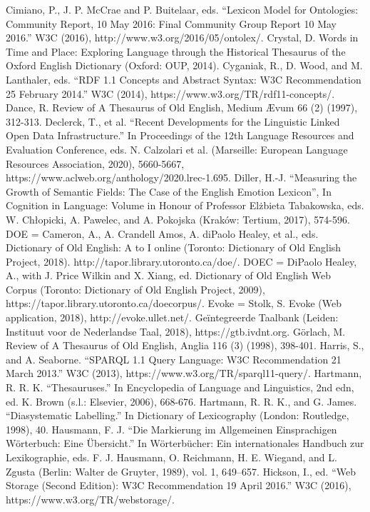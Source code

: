 Cimiano, P., J. P. McCrae and P. Buitelaar, eds. “Lexicon Model for Ontologies: Community Report, 10 May 2016: Final Community Group Report 10 May 2016.” W3C (2016), http://www.w3.org/2016/05/ontolex/.
Crystal, D. Words in Time and Place: Exploring Language through the Historical Thesaurus of the Oxford English Dictionary (Oxford: OUP, 2014).
Cyganiak, R., D. Wood, and M. Lanthaler, eds. “RDF 1.1 Concepts and Abstract Syntax: W3C Recommendation 25 February 2014.” W3C (2014), https://www.w3.org/TR/rdf11-concepts/.
Dance, R. Review of A Thesaurus of Old English, Medium Ævum 66 (2) (1997), 312-313.
Declerck, T., et al. “Recent Developments for the Linguistic Linked Open Data Infrastructure.” In Proceedings of the 12th Language Resources and Evaluation Conference, eds. N. Calzolari et al. (Marseille: European Language Resources Association, 2020), 5660-5667, https://www.aclweb.org/anthology/2020.lrec-1.695.
Diller, H.-J. “Measuring the Growth of Semantic Fields: The Case of the English Emotion Lexicon”, In Cognition in Language: Volume in Honour of Professor Elżbieta Tabakowska, eds. W. Chłopicki, A. Pawelec, and A. Pokojska (Kraków: Tertium, 2017), 574-596.
DOE = Cameron, A., A. Crandell Amos, A. diPaolo Healey, et al., eds. Dictionary of Old English: A to I online (Toronto: Dictionary of Old English Project, 2018). http://tapor.library.utoronto.ca/doe/.
DOEC = DiPaolo Healey, A., with J. Price Wilkin and X. Xiang, ed. Dictionary of Old English Web Corpus (Toronto: Dictionary of Old English Project, 2009), https://tapor.library.utoronto.ca/doecorpus/.
Evoke = Stolk, S. Evoke (Web application, 2018), http://evoke.ullet.net/.
Geïntegreerde Taalbank (Leiden: Instituut voor de Nederlandse Taal, 2018), https://gtb.ivdnt.org.
Görlach, M. Review of A Thesaurus of Old English, Anglia 116 (3) (1998), 398-401.
Harris, S., and A. Seaborne. “SPARQL 1.1 Query Language: W3C Recommendation 21 March 2013.” W3C (2013), https://www.w3.org/TR/sparql11-query/.
Hartmann, R. R. K. “Thesauruses.” In Encyclopedia of Language and Linguistics, 2nd edn, ed. K. Brown (s.l.: Elsevier, 2006), 668-676.
Hartmann, R. R. K., and G. James. “Diasystematic Labelling.” In Dictionary of Lexicography (London: Routledge, 1998), 40.
Hausmann, F. J. “Die Markierung im Allgemeinen Einsprachigen Wörterbuch: Eine Übersicht.” In Wörterbücher: Ein internationales Handbuch zur Lexikographie, eds. F. J. Hausmann, O. Reichmann, H. E. Wiegand, and L. Zgusta (Berlin: Walter de Gruyter, 1989), vol. 1, 649–657.
Hickson, I., ed. “Web Storage (Second Edition): W3C Recommendation 19 April 2016.” W3C (2016), https://www.w3.org/TR/webstorage/.
